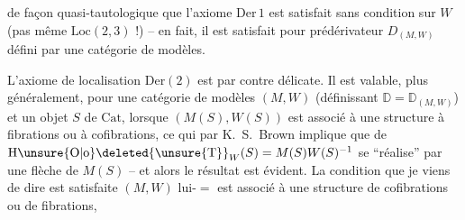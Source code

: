 de façon quasi-tautologique que l'axiome $\mathrm{Der}\,1$ est satisfait sans condition sur $W$ (pas même $\mathrm{Loc}(2,3)$ !) -- en fait, il est satisfait pour  prédérivateur $D_{(M,W)}$ défini par une catégorie de modèles.

L'axiome de localisation $\mathrm{Der}(2)$ est par contre   délicate.  Il est valable, plus généralement, pour une catégorie de modèles $(M,W)$ (définissant  $\mathbb{D}=\mathbb{D}_{(M,W)}$) et un objet $S$ de $\mathrm{Cat}$, lorsque $(M(S),W(S))$ est associé à une structure à fibrations ou à cofibrations, ce qui par K.~S.~Brown implique que   de ${\mathrm{H}\unsure{\mathrm{O}|\mathrm{o}}\deleted{\unsure{\mathrm{T}}}}_W(S) =M(S)W(S)^{-1}$ se ``réalise'' par une flèche de $M(S)$ -- et alors le résultat est évident. La condition que je viens de dire est satisfaite    $(M,W)$ lui-\ensuremath{=} est associé à une structure de cofibrations ou de fibrations,
